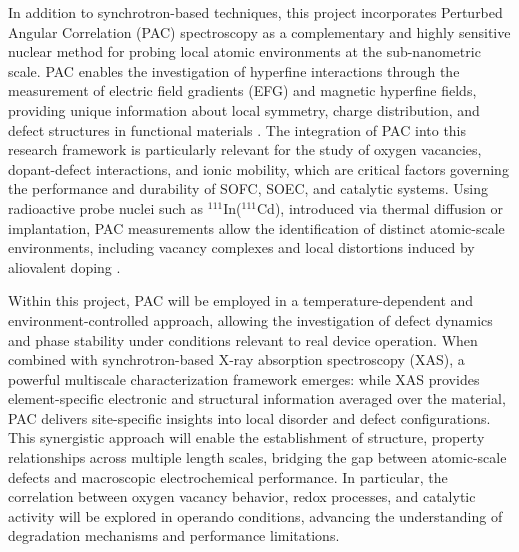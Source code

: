 In addition to synchrotron-based techniques, this project incorporates Perturbed Angular Correlation (PAC) spectroscopy as a complementary and highly sensitive nuclear method for probing local atomic environments at the sub-nanometric scale. PAC enables the investigation of hyperfine interactions through the measurement of electric field gradients (EFG) and magnetic hyperfine fields, providing unique information about local symmetry, charge distribution, and defect structures in functional materials \cite{Dogra2001,schatz_weidinger_1996}. The integration of PAC into this research framework is particularly relevant for the study of oxygen vacancies, dopant-defect interactions, and ionic mobility, which are critical factors governing the performance and durability of SOFC, SOEC, and catalytic systems. Using radioactive probe nuclei such as $^{111}$In($^{111}$Cd), introduced via thermal diffusion or implantation, PAC measurements allow the identification of distinct atomic-scale environments, including vacancy complexes and local distortions induced by aliovalent doping \cite{santos2024,silva2023,Ferreira2021}.

Within this project, PAC will be employed in a temperature-dependent and environment-controlled approach, allowing the investigation of defect dynamics and phase stability under conditions relevant to real device operation. When combined with synchrotron-based X-ray absorption spectroscopy (XAS), a powerful multiscale characterization framework emerges: while XAS provides element-specific electronic and structural information averaged over the material, PAC delivers site-specific insights into local disorder and defect configurations. This synergistic approach will enable the establishment of structure, property relationships across multiple length scales, bridging the gap between atomic-scale defects and macroscopic electrochemical performance. In particular, the correlation between oxygen vacancy behavior, redox processes, and catalytic activity will be explored in operando conditions, advancing the understanding of degradation mechanisms and performance limitations.



